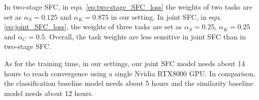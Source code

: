 In two-stage SFC, in equ. \ref{eq:two-stage_SFC_loss} the weights of two tasks are set as $\alpha_S=0.125$ and $\alpha_K=0.875$ in our setting. 
In joint SFC, in equ. \ref{eq:joint_SFC_loss}, the weights of three tasks are set as $\alpha_S=0.25$, $\alpha_K=0.25$ and $\alpha_C=0.5$. 
Overall, the task weights are less sensitive in joint SFC than in two-stage SFC.

As for the training time, in our settings, our joint SFC model needs about 14 hours to reach convergence using a single Nvidia RTX8000 GPU. 
In comparison, the classification baseline model needs about 5 hours and the similarity baseline model needs about 12 hours.

